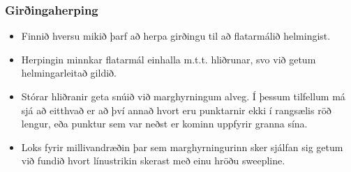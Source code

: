 \documentclass{beamer}
\begin{document}
\begin{frame}
\frametitle{Girðingaherping}

\begin{itemize}

\item Finnið hversu mikið þarf að herpa girðingu til að flatarmálið helmingist.

\vspace*{0.25cm}

\item Herpingin minnkar flatarmál einhalla m.t.t. hliðrunar, svo við getum helmingarleitað gildið.

\vspace*{0.25cm}

\item Stórar hliðranir geta snúið við marghyrningum alveg. Í þessum tilfellum má sjá að eitthvað er að því annað hvort eru punktarnir ekki í rangsælis röð lengur, eða punktur sem var neðst er kominn uppfyrir granna sína.

\vspace*{0.25cm}

\item Loks fyrir millivandræðin þar sem marghyrningurinn sker sjálfan sig getum við fundið hvort línustrikin skerast með einu hröðu sweepline.

\end{itemize}

\end{frame}
\end{document}
